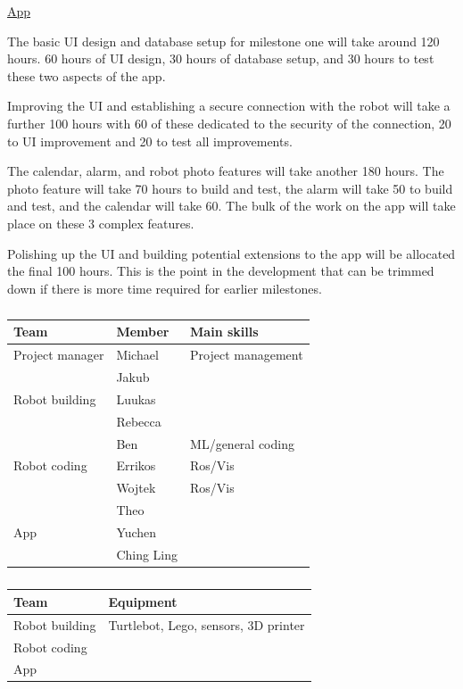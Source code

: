 \documentclass{article}
\begin{document}
\underline{App}

The basic UI design and database setup for milestone one will take around 120 hours. 60 hours of UI design, 30 hours of database setup, and 30 hours to test these two aspects of the app.

Improving the UI and establishing a secure connection with the robot will take a further 100 hours with 60 of these dedicated to the security of the connection, 20 to UI improvement and 20 to test all improvements.

The calendar, alarm, and robot photo features will take another 180 hours. The photo feature will take 70 hours to build and test, the alarm will take 50 to build and test, and the calendar will take 60. The bulk of the work on the app will take place on these 3 complex features.

Polishing up the UI and building potential extensions to the app will be allocated the final 100 hours. This is the point in the development that can be trimmed down if there is more time required for earlier milestones.

\begin{table}[]
  \begin{tabular}{|l|l|l|}
    \hline
    {\bf Team}           & {\bf Member}& {\bf Main skills} \\ \hline
    Project manager      & Michael     & Project management \\ \hline
                         & Jakub       & \\ \cline{2-3}
    Robot building       & Luukas      & \\ \cline{2-3}
                         & Rebecca     & \\ \hline
                         & Ben         & ML/general coding\\ \cline{2-3}
    Robot coding         & Errikos     & Ros/Vis \\ \cline{2-3}
                         & Wojtek      & Ros/Vis \\ \hline
                         & Theo        & \\ \cline{2-3}
    App                  & Yuchen      & \\ \cline{2-3}
                         & Ching Ling  & \\ \hline
  \end{tabular}
  \caption{}
\end{table}

\begin{table}[]
  \begin{tabular}{|l|l|}
    \hline
    {\bf Team}           & {\bf Equipment} \\ \hline
    Robot building       & Turtlebot, Lego, sensors, 3D printer\\ \hline
    Robot coding         & \\ \hline
    App                  & \\ \hline
  \end{tabular}
  \caption{}
\end{table}
\end{document}
